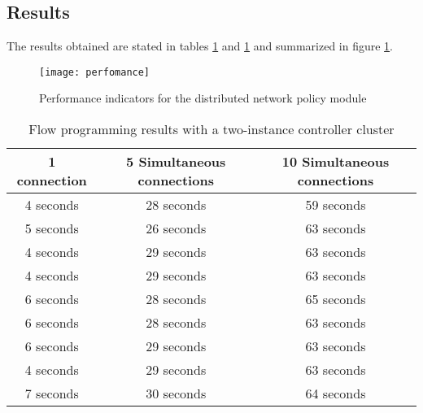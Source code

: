 \subsection{Results}
\label{subsection:performance-tests-results}
%
The results obtained are stated in tables \ref{table:perfomance-tests-2controllers} and \ref{table:perfomance-tests-2controllers} and summarized in figure \ref{fig:perfomance}.
%
\begin{figure}
	\centering
	\texttt{[image: perfomance]}
	\caption{Performance indicators for the distributed network policy module}
	\label{fig:perfomance}
\end{figure}
%
\begin{table}[h!]
	\begin{center}
		\begin{tabular}{ | c | c | c | }
			\rowcolor{HeaderRowColor}
			\hline
			\textbf{1 connection} & \textbf{5 Simultaneous connections} & \textbf{10 Simultaneous connections}\\
			\hline
			4 seconds & 28 seconds & 59 seconds\\
			\hline
			5 seconds & 26 seconds & 63 seconds\\
			\hline
			4 seconds & 29 seconds & 63 seconds\\
			\hline
			4 seconds & 29 seconds & 63 seconds\\
			\hline
			6 seconds & 28 seconds & 65 seconds\\
			\hline
			6 seconds & 28 seconds & 63 seconds\\
			\hline
			6 seconds & 29 seconds & 63 seconds\\
			\hline
			4 seconds & 29 seconds & 63 seconds\\
			\hline
			7 seconds & 30 seconds & 64 seconds\\
			\hline
		\end{tabular}
		\caption{Flow programming results with a two-instance controller cluster}
		\label{table:perfomance-tests-2controllers}
	\end{center}
\end{table}
%
